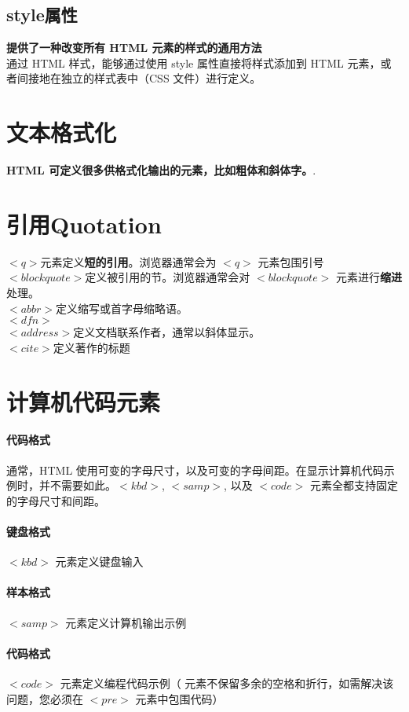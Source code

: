 \documentclass[10pt,UTF8]{ctexart}
\begin{document}
\subsection{style属性}
\textbf{提供了一种改变所有 HTML 元素的样式的通用方法}\\
通过 HTML 样式，能够通过使用 style 属性直接将样式添加到 HTML 元素，或者间接地在独立的样式表中（CSS 文件）进行定义。

\section{文本格式化}
\textbf{HTML 可定义很多供格式化输出的元素，比如粗体和斜体字。}.

\section{引用Quotation}
$<q>$元素定义\textbf{短的引用}。浏览器通常会为 $<q>$ 元素包围引号 \\
$<blockquote>$定义被引用的节。浏览器通常会对 $<blockquote>$ 元素进行\textbf{缩进}处理。 \\
$<abbr>$定义缩写或首字母缩略语。\\
$<dfn>$ \\
$<address>$定义文档联系作者，通常以斜体显示。\\
$<cite>$定义著作的标题

\section{计算机代码元素}
\paragraph{代码格式} 通常，HTML 使用可变的字母尺寸，以及可变的字母间距。在显示计算机代码示例时，并不需要如此。$<kbd>$, $<samp>$, 以及 $<code>$ 元素全都支持固定的字母尺寸和间距。
\paragraph{键盘格式}  $<kbd>$ 元素定义键盘输入
\paragraph{样本格式} $<samp>$ 元素定义计算机输出示例
\paragraph{代码格式}  $<code>$ 元素定义编程代码示例（ 元素不保留多余的空格和折行，如需解决该问题，您必须在 $<pre>$ 元素中包围代码）
\end{document}
